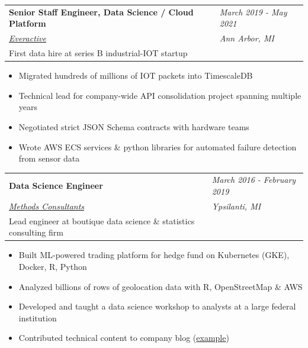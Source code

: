 \documentclass[margin,line]{res}
\begin{document}
\begin{resume}
  \begin{tabular}{p{4.6in} l}
    {\bf Senior Staff Engineer, Data Science / Cloud Platform} & \emph{March 2019 - May 2021} \\
    \href{https://everactive.com/}{\it Everactive}             & \emph{Ann Arbor, MI}         \\
    First data hire at series B industrial-IOT startup
  \end{tabular}
  \vspace{2pt}
  \begin{itemize}\itemsep -2pt
    \item Migrated hundreds of millions of IOT packets into TimescaleDB
    \item Technical lead for company-wide API consolidation project spanning multiple years
    \item Negotiated strict JSON Schema contracts with hardware teams
    \item Wrote AWS ECS services \& python libraries for automated failure detection from sensor data
  \end{itemize}
  
  \begin{tabular}{p{4.6in} l}
    {\bf Data Science Engineer}                                         & \emph{March 2016 - February 2019} \\
    \href{https://www.methodsconsultants.com/}{\it Methods Consultants} & \emph{Ypsilanti, MI}              \\
    Lead engineer at boutique data science \& statistics consulting firm
  \end{tabular}
  \vspace{2pt}
  \begin{itemize}\itemsep -2pt
    \item Built ML-powered trading platform for hedge fund on Kubernetes (GKE), Docker, R, Python
    \item Analyzed billions of rows of geolocation data with R, OpenStreetMap \& AWS
    \item Developed and taught a data science workshop to analysts at a large federal institution
    \item Contributed technical content to company blog (\href{https://www.r-bloggers.com/2018/07/a-tour-of-timezones-troubles-in-r/}{example})
  \end{itemize}
  

\end{resume}
\end{document}
